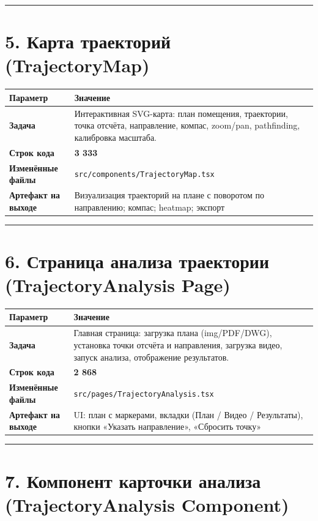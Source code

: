 \documentclass[12pt,a4paper]{article}
\begin{document}
\vspace{1em}
\hrule
\vspace{1em}

\section{5. Карта траекторий (TrajectoryMap)}

\begin{tabular}{>{\bfseries}l p{10cm}}
\toprule
Параметр & Значение \\
\midrule
Задача & Интерактивная SVG-карта: план помещения, траектории, точка отсчёта, направление, компас, zoom/pan, pathfinding, калибровка масштаба. \\
Строк кода & \textbf{3 333} \\
Изменённые файлы & \texttt{src/components/TrajectoryMap.tsx} \\
Артефакт на выходе & Визуализация траекторий на плане с поворотом по направлению; компас; heatmap; экспорт \\
\bottomrule
\end{tabular}

\vspace{1em}
\hrule
\vspace{1em}

\section{6. Страница анализа траектории (TrajectoryAnalysis Page)}

\begin{tabular}{>{\bfseries}l p{10cm}}
\toprule
Параметр & Значение \\
\midrule
Задача & Главная страница: загрузка плана (img/PDF/DWG), установка точки отсчёта и направления, загрузка видео, запуск анализа, отображение результатов. \\
Строк кода & \textbf{2 868} \\
Изменённые файлы & \texttt{src/pages/TrajectoryAnalysis.tsx} \\
Артефакт на выходе & UI: план с маркерами, вкладки (План / Видео / Результаты), кнопки «Указать направление», «Сбросить точку» \\
\bottomrule
\end{tabular}

\vspace{1em}
\hrule
\vspace{1em}

\section{7. Компонент карточки анализа (TrajectoryAnalysis Component)}
\end{document}

